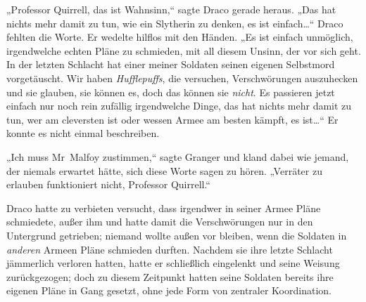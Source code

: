 „Professor Quirrell, das ist Wahnsinn,“ sagte Draco gerade heraus. „Das hat nichts mehr damit zu tun, wie ein Slytherin zu denken, es ist einfach…“ Draco fehlten die Worte. Er wedelte hilflos mit den Händen. „Es ist einfach unmöglich, irgendwelche echten Pläne zu schmieden, mit all diesem Unsinn, der vor sich geht. In der letzten Schlacht hat einer meiner Soldaten seinen eigenen Selbstmord vorgetäuscht. Wir haben \emph{Hufflepuffs}, die versuchen, Verschwörungen auszuhecken und sie glauben, sie können es, doch das können sie \emph{nicht}. Es passieren jetzt einfach nur noch rein zufällig irgendwelche Dinge, das hat nichts mehr damit zu tun, wer am cleversten ist oder wessen Armee am besten kämpft, es ist…“ Er konnte es nicht einmal beschreiben.

„Ich muss Mr~Malfoy zustimmen,“ sagte Granger und kland dabei wie jemand, der niemals erwartet hätte, sich diese Worte sagen zu hören. „Verräter zu erlauben funktioniert nicht, Professor Quirrell.“

Draco hatte zu verbieten versucht, dass irgendwer in seiner Armee Pläne schmiedete, außer ihm und hatte damit die Verschwörungen nur in den Untergrund getrieben; niemand wollte außen vor bleiben, wenn die Soldaten in \emph{anderen} Armeen Pläne schmieden durften. Nachdem sie ihre letzte Schlacht jämmerlich verloren hatten, hatte er schließlich eingelenkt und seine Weisung zurückgezogen; doch zu diesem Zeitpunkt hatten seine Soldaten bereits ihre eigenen Pläne in Gang gesetzt, ohne jede Form von zentraler Koordination.

